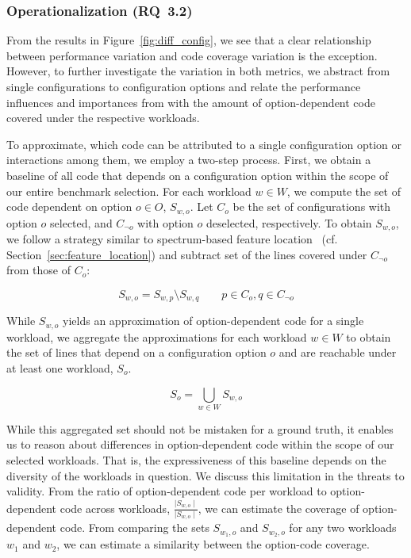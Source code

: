
\subsubsection{Operationalization (RQ~3.2)}
From the results in Figure~\ref{fig:diff_config}, we see that {\color{red} a clear relationship between performance variation and code coverage variation is the exception.} However, to further investigate the variation in both metrics, we abstract from single configurations to configuration options and relate the performance influences and importances from  with the amount of option-dependent code covered under the respective workloads.

To approximate, which code can be attributed to a single configuration option or interactions among them, we employ a two-step process. First, we obtain a baseline of all code that depends on a configuration option within the scope of our entire benchmark selection. For each workload $w \in W$, we compute the set of code dependent on option $o \in O$, $S_{w, o}$. Let $C_{o}$ be the set of configurations with option $o$ selected, and $C_{\neg o}$ with option $o$ deselected, respectively. To obtain $S_{w, o}$, we follow a strategy similar to spectrum-based feature location~\cite{michelon_spectrum_2021} (cf. Section~\ref{sec:feature_location}) and subtract set of the lines covered under $C_{\neg o}$ from those of $C_{o}$:

\begin{equation}
	S_{w, o} = S_{w, p} \setminus S_{w, q} \qquad p \in C_{o}, q \in C_{\neg o}
\end{equation}

While $S_{w, o}$ yields an approximation of option-dependent code for a single workload, we aggregate the approximations for each workload $w \in W$ to obtain the set of lines that depend on a configuration option $o$ and are reachable under at least one workload, $S_{o}$. 

\begin{equation}
	S_{o} = \bigcup_{w \in W} S_{w, o}
\end{equation}

While this aggregated set should not be mistaken for a ground truth, it enables us to reason about differences in option-dependent code within the scope of our selected workloads. That is, the expressiveness of this baseline depends on the diversity of the workloads in question. We discuss this limitation in the threats to validity. From the ratio of option-dependent code per workload to option-dependent code across workloads, $\frac{\mid S_{w, o}\mid}{\mid S_{w, o}\mid}$, we can estimate the coverage of option-dependent code. From comparing the sets $S_{w_1, o}$ and $S_{w_2, o}$ for any two workloads $w_1$ and $w_2$, we can estimate a similarity between the option-code coverage.

